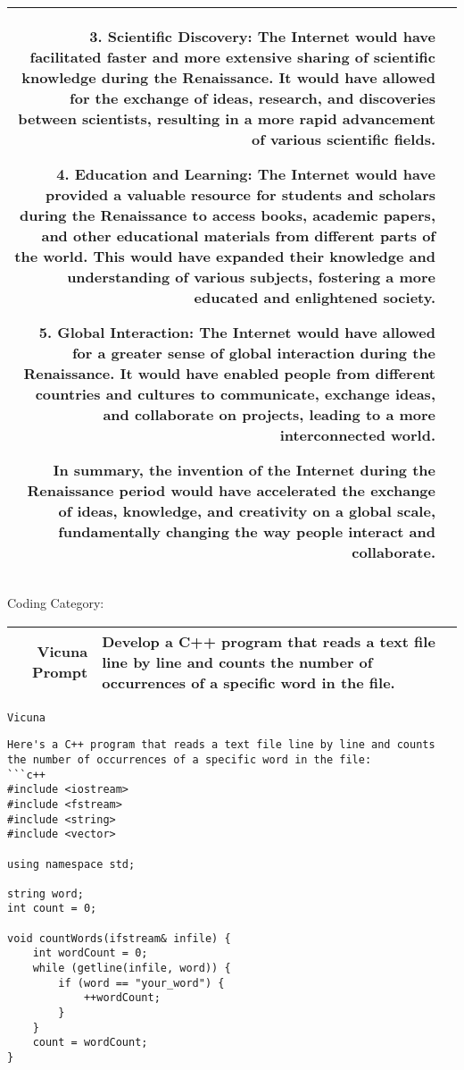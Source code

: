 \documentclass{article}
\begin{document}
{{\begin{tabularx}{\linewidth}{r X}
3. Scientific Discovery: The Internet would have facilitated faster and more extensive sharing of scientific knowledge during the Renaissance. It would have allowed for the exchange of ideas, research, and discoveries between scientists, resulting in a more rapid advancement of various scientific fields.

4. Education and Learning: The Internet would have provided a valuable resource for students and scholars during the Renaissance to access books, academic papers, and other educational materials from different parts of the world. This would have expanded their knowledge and understanding of various subjects, fostering a more educated and enlightened society.

5. Global Interaction: The Internet would have allowed for a greater sense of global interaction during the Renaissance. It would have enabled people from different countries and cultures to communicate, exchange ideas, and collaborate on projects, leading to a more interconnected world.

In summary, the invention of the Internet during the Renaissance period would have accelerated the exchange of ideas, knowledge, and creativity on a global scale, fundamentally changing the way people interact and collaborate.
 \\
 \bottomrule
 \end{tabularx} }

\newpage
Coding Category:

{  \footnotesize \begin{tabularx}{\linewidth}{r X} \toprule Vicuna Prompt  & {\bf Develop a C++ program that reads a text file line by line and counts the number of occurrences of a specific word in the file.}
\\
 \bottomrule
 \end{tabularx} }
\texttt{Vicuna} 
\begin{lstlisting}[upquote=true]
Here's a C++ program that reads a text file line by line and counts the number of occurrences of a specific word in the file:
```c++
#include <iostream>
#include <fstream>
#include <string>
#include <vector>

using namespace std;

string word;
int count = 0;

void countWords(ifstream& infile) {
    int wordCount = 0;
    while (getline(infile, word)) {
        if (word == "your_word") {
            ++wordCount;
        }
    }
    count = wordCount;
}


\end{lstlisting}}
\end{document}
